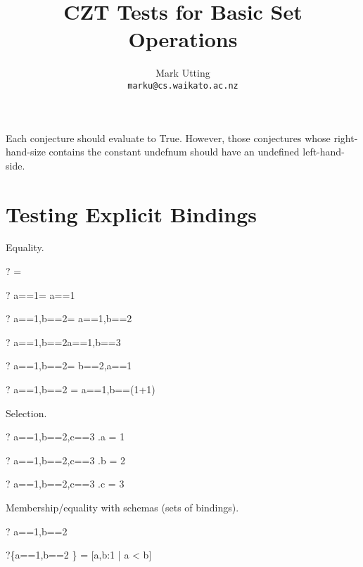 \documentclass{article}
\title{CZT Tests for Basic Set Operations}
\author{Mark Utting \\ \texttt{marku@cs.waikato.ac.nz}}
\begin{document}
\maketitle

Each conjecture should evaluate to True.
However, those conjectures whose right-hand-size contains
the constant undefnum should have an undefined left-hand-side.


\section{Testing Explicit Bindings}

Equality.
\begin{zed}\vdash? \lblot\rblot= \lblot\rblot\end{zed}
\begin{zed}\vdash? \lblot a==1\rblot= \lblot a==1\rblot\end{zed}
\begin{zed}\vdash? \lblot a==1,b==2\rblot= \lblot a==1,b==2\rblot\end{zed}
\begin{zed}\vdash? \lblot a==1,b==2\rblot\neq \lblot a==1,b==3\rblot\end{zed}
\begin{zed}\vdash? \lblot a==1,b==2\rblot= \lblot b==2,a==1\rblot\end{zed}
\begin{zed}\vdash? \lblot a==1,b==2 \rblot = \lblot a==1,b==(1+1)\rblot\end{zed}

Selection.
\begin{zed}\vdash? \lblot a==1,b==2,c==3 \rblot.a = 1 \end{zed}
\begin{zed}\vdash? \lblot a==1,b==2,c==3 \rblot.b = 2 \end{zed}
\begin{zed}\vdash? \lblot a==1,b==2,c==3 \rblot.c = 3 \end{zed}

Membership/equality with schemas (sets of bindings).
\begin{zed}\vdash? \lblot a==1,b==2 \rblot \in [a,b:1 \upto 3 | a < b]\end{zed}
\begin{zed}\vdash?\{\lblot a==1,b==2 \rblot\} = [a,b:1  | a < b]\end{zed}
\end{document}
